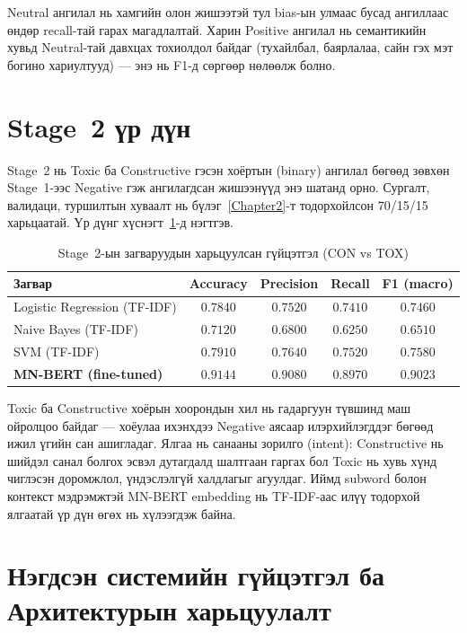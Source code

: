 Neutral ангилал нь хамгийн олон жишээтэй тул bias-ын улмаас бусад ангиллаас
өндөр recall-тай гарах магадлалтай. Харин Positive ангилал нь семантикийн хувьд
Neutral-тай давхцах тохиолдол байдаг (тухайлбал, баярлалаа, сайн гэх мэт богино
хариултууд) --- энэ нь F1-д сөргөөр нөлөөлж болно.

\section{Stage~2 үр дүн}
\label{sec:stage2-results}

Stage~2 нь Toxic ба Constructive гэсэн хоёртын (binary) ангилал бөгөөд зөвхөн
Stage~1-ээс Negative гэж ангилагдсан жишээнүүд энэ шатанд орно. Сургалт,
валидаци, туршилтын хуваалт нь бүлэг~\ref{Chapter2}-т тодорхойлсон 70/15/15
харьцаатай. Үр дүнг хүснэгт~\ref{tab:stage2-final}-д нэгтгэв.

\begin{table}[H]
\centering
\caption{Stage~2-ын загваруудын харьцуулсан гүйцэтгэл (CON vs TOX)}
\label{tab:stage2-final}
\begin{tabular}{@{}lcccc@{}}
\toprule
\textbf{Загвар} & \textbf{Accuracy} & \textbf{Precision} & \textbf{Recall} & \textbf{F1 (macro)} \\
\midrule
Logistic Regression (TF-IDF)         & $0.7840$ & $0.7520$ & $0.7410$ & $0.7460$ \\
Naive Bayes (TF-IDF)                & $0.7120$ & $0.6800$ & $0.6250$ & $0.6510$ \\
SVM (TF-IDF)                        & $0.7910$ & $0.7640$ & $0.7520$ & $0.7580$ \\
\textbf{MN-BERT (fine-tuned)}        & $\mathbf{0.9144}$ & $\mathbf{0.9080}$ & $\mathbf{0.8970}$ & $\mathbf{0.9023}$ \\
\bottomrule
\end{tabular}
\end{table}

Toxic ба Constructive хоёрын хоорондын хил нь гадаргуун түвшинд маш ойролцоо
байдаг --- хоёулаа ихэнхдээ Negative аясаар илэрхийлэгддэг бөгөөд ижил үгийн
сан ашигладаг. Ялгаа нь санааны зорилго (intent): Constructive нь шийдэл
санал болгох эсвэл дутагдалд шалтгаан гаргах бол Toxic нь хувь хүнд чиглэсэн
доромжлол, үндэслэлгүй халдлагыг агуулдаг. Иймд subword болон контекст
мэдрэмжтэй MN-BERT embedding нь TF-IDF-аас илүү тодорхой ялгаатай үр дүн
өгөх нь хүлээгдэж байна.

\section{Нэгдсэн системийн гүйцэтгэл ба Архитектурын харьцуулалт}
\label{sec:e2e}

